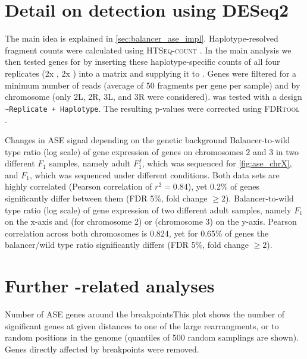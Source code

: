 \section{Detail on \texorpdfstring{\ase}{ASE} detection using DESeq2}
\label{sec:suppl_deseq}
The main idea is explained in \cref{sec:balancer_ase_impl}. Haplotype-resolved
fragment counts were calculated using \textsc{HTSeq-count} \citep{Anders2015}.
In the main analysis we then tested genes for \ase by inserting these
haplotype-specific counts of all four replicates (2x \Nmat, 2x \Npat) into a
matrix and supplying it to \deseq. Genes were filtered for a minimum number of
reads (average of 50 fragments per gene per sample) and by chromosome (only 2L,
2R, 3L, and 3R were considered). \deseq was tested with a design
\texttt{\footnotesize \textasciitilde Replicate + Haplotype}. The resulting
p-values were corrected using \textsc{FDRtool} \citep{Strimmer2008}.



    {Changes in ASE signal depending on the genetic background}{
     Balancer-to-wild type ratio (log scale) of gene
    expression of genes on chromosomes 2 and 3 in two different $F_1$ samples,
    namely adult $F_1^f$, which was sequenced for \cref{fig:ase_chrX}, and $F_1$,
    which was sequenced under different conditions. Both data sets are highly
    correlated (Pearson correlation of $r^2 = 0.84$), yet 0.2\% of genes significantly differ
    between them (FDR 5\%, fold change $\geq 2$).
     Balancer-to-wild type ratio (log scale) of gene expression
    of two different adult samples, namely $F_1$ on the x-axis and \Fcyo (for
    chromosome 2) or \Ftm (chromosome 3) on the y-axis. Pearson correlation
    across both chromosomes is 0.824, yet for 0.65\% of genes the balancer/wild
    type ratio significantly differs (FDR 5\%, fold change $\geq 2$).}


\section{Further \texorpdfstring{\ase}{ASE}-related analyses}
\label{sec:suppl_ase_more}

    {Number of ASE genes around the breakpoints}{This plot shows the number of significant \ase
    genes at given distances to one of the large rearrangments, or to random
    positions in the genome (quantiles of 500 random samplings are shown).
    Genes directly affected by breakpoints were removed.}






